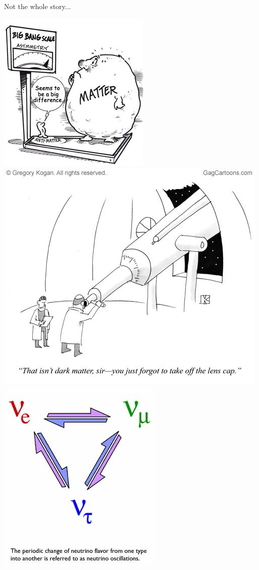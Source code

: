 \documentclass[aspectratio=1610]{beamer}
\begin{document}
\begin{frame}{Not the whole story...}

\begin{center}
\includegraphics[height=0.5\textheight]{figs/matter-antimatter.jpg}
\includegraphics[height=0.5\textheight]{figs/darkmatter.jpg}
\includegraphics[height=0.5\textheight]{figs/13_oscill.jpeg}
\end{center}


\end{frame}
\end{document}
